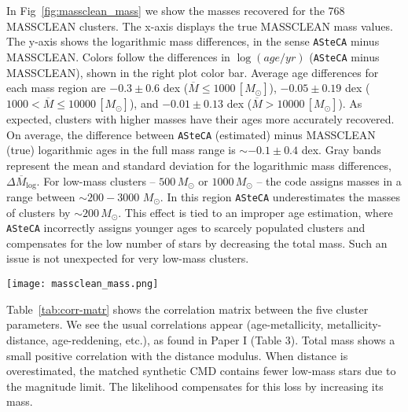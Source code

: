 \documentclass{aa}
\begin{document}
\begin{appendix}
In Fig~\ref{fig:massclean_mass} we show the masses recovered for the 768
MASSCLEAN clusters. The x-axis displays the true MASSCLEAN mass
values. The y-axis shows the logarithmic mass differences, in the sense \texttt
{ASteCA} minus MASSCLEAN.\@
%
Colors follow the differences in $\log(age/yr)$ (\texttt{ASteCA} minus
MASSCLEAN), shown in the right plot color bar.
Average age differences for each mass region are 
$-0.3{\pm}0.6$ dex ($\overline{M}{\le}1000\,[M_{\odot}]$),
$-0.05{\pm}0.19$ dex ($1000{<}\overline{M}{\le}10000\,[M_{\odot}]$), and
$-0.01{\pm}0.13$ dex ($\overline{M}{>}10000\,[M_{\odot}]$).
As expected, clusters with higher masses have their ages more accurately
recovered. On average, the difference between \texttt{ASteCA} (estimated) minus
MASSCLEAN (true) logarithmic ages in the full mass range is ${\sim}-0.1{\pm}0.4$
dex.
%
Gray bands represent the mean and standard deviation for the logarithmic
mass differences, $\overline{\Delta M_{\log}}$.
%
For low-mass clusters -- $500\,M_{\odot}$ or $1000\,M_{\odot}$ -- the
code assigns masses in a range between ${\sim}200{-}3000$ $M_{\odot}$.
In this region \texttt{ASteCA} underestimates the masses of clusters by
${\sim}200\,M_{\odot}$. This effect is tied to an improper age estimation, where
\texttt{ASteCA} incorrectly assigns younger ages to scarcely populated clusters
and compensates for the low number of stars by decreasing the total mass. Such an
issue is not unexpected for very low-mass clusters.

\begin{figure*}
\texttt{[image: massclean\_mass.png]}
\caption{Recovered masses by \texttt{ASteCA} for the 768 MASSCLEAN clusters.
Logarithmic mass differences $\Delta M_{\log}$ are obtained in the sense
\texttt{ASteCA} minus MASSCLEAN and shown in the y-axis. MASSCLEAN masses in
the x-axis are perturbed with a small random scatter.}
\label{fig:massclean_mass}
\end{figure*}

Table~\ref{tab:corr-matr} shows the correlation matrix between the five cluster
parameters. We see the usual correlations appear (age-metallicity,
metallicity-distance, age-reddening, etc.), as found in Paper I (Table 3).
Total mass shows a small positive correlation with the distance modulus.
When distance is overestimated, the matched synthetic CMD contains fewer
low-mass stars due to the magnitude limit. The likelihood compensates for this
loss by increasing its mass.


\end{appendix}
\end{document}
